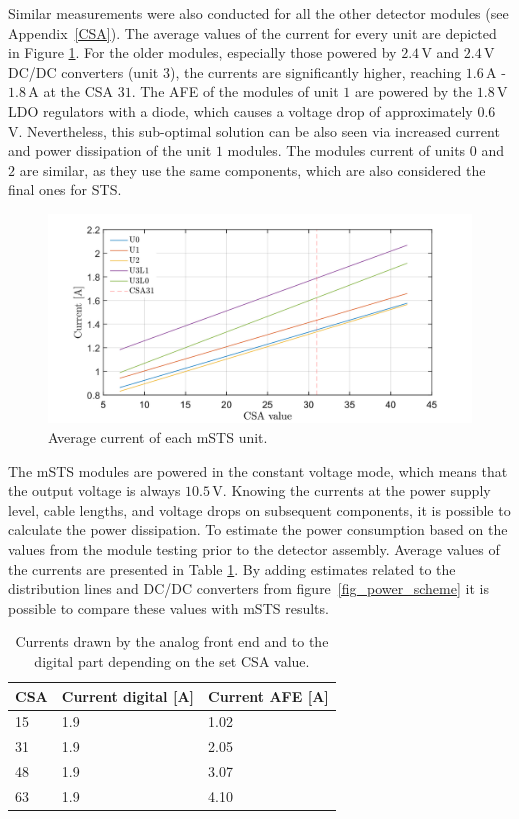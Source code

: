 Similar measurements were also conducted for all the other detector modules (see Appendix~\ref{CSA}). The average values of the current for every unit are depicted in Figure \ref{fig_avg}. For the older modules, especially those powered by $2.4$\,V and $2.4$\,V DC/DC converters (unit $3$), the currents are significantly higher, reaching $1.6$\,A - $1.8$\,A at the \gls{CSA} $31$. The \gls{AFE} of the modules of unit $1$ are powered by the $1.8$\,V \gls{LDO} regulators with a diode, which causes a voltage drop of approximately $0.6$\,V. Nevertheless, this sub-optimal solution can be also seen via increased current and power dissipation of the unit $1$ modules. The modules current of units $0$ and $2$ are similar, as they use the same components, which are also considered the final ones for \gls{STS}.

\begin{figure}[h!]
\centering
\includegraphics[width=0.9\columnwidth]{Chapter6/DCS/images/units.png}
\caption{Average current of each \gls{mSTS} unit.}
\label{fig_avg}
\end{figure}
\newpage
The \gls{mSTS} modules are powered in the constant voltage mode, which means that the output voltage is always $10.5$\,V. Knowing the currents at the power supply level, cable lengths, and voltage drops on subsequent components, it is possible to calculate the power dissipation. 
To estimate the power consumption based on the values from the module testing prior to the detector assembly. Average values of the currents are presented in Table \ref{tab:typical_cons}. By adding estimates related to the distribution lines and DC/DC converters from figure~\ref{fig_power_scheme} it is possible to compare these values with \gls{mSTS} results.
\begin{table}[!h]
\caption{Currents drawn by the analog front end and to the digital part depending on the set \gls{CSA} value.}
\centering
\begin{tabular}{lll}
\hline
CSA & Current digital {[}A{]} & Current \gls{AFE} {[}A{]} \\ \hline
15  & 1.9                 & 1.02                    \\
31  & 1.9                 & 2.05                    \\
48  & 1.9                 & 3.07                    \\
63  & 1.9                 & 4.10                    \\ \hline
\end{tabular}

\label{tab:typical_cons}
\end{table}

